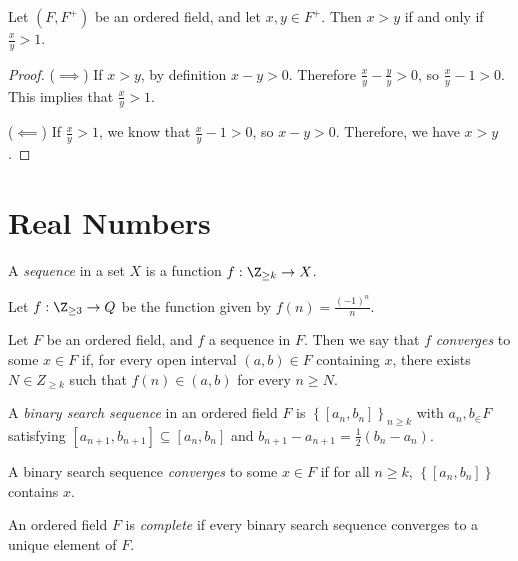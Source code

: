 \documentclass[12pt]{article}
\begin{document}
\begin{prop}\label{greater-than-ratio}
    Let $(F, F^+)$ be an ordered field, and let $x, y \in F^{+}$. Then $x > y$ if and only if $\frac{x}{y} > 1$.
\end{prop}

\begin{proof}\proofbreak
    ($\implies$) If $x > y$, by definition $x - y > 0$. Therefore $\frac{x}{y} - \frac{y}{y} > 0$, so $\frac{x}{y} - 1 > 0$. This implies that $\frac{x}{y} > 1$.

    ($\impliedby$) If $\frac{x}{y} > 1$, we know that $\frac{x}{y} - 1 > 0$, so $x - y > 0$. Therefore, we have $x > y$.
\end{proof}

\section{Real Numbers}

\begin{defn}
    A \emph{sequence} in a set $X$ is a function $f: \Z_{\geq k} \to X$.
\end{defn}

\begin{exmp}
    Let $f: \Z_{\geq 3} \to Q$ be the function given by $f(n) = \frac{(-1)^n}{n}$.
\end{exmp}

\begin{defn}
    Let $F$ be an ordered field, and $f$ a sequence in $F$. Then we say that $f$ \emph{converges} to some $x \in F$ if, for every open interval $(a, b) \in F$ containing $x$, there exists $N \in Z_{\geq k}$ such that $f(n) \in (a, b)$ for every $n \geq N$.
\end{defn}

\begin{defn}
    A \emph{binary search sequence} in an ordered field $F$ is $\left\{[a_n, b_n]\right\}_{n \geq k}$ with $a_n, b_ \in F$ satisfying $[a_{n+1}, b_{n+1}] \subseteq [a_n, b_n]$ and $b_{n+1}-a_{n+1} = \frac{1}{2}(b_n - a_n)$.
\end{defn}

\begin{defn}
    A binary search sequence \emph{converges} to some $x \in F$ if for all $n \geq k$, $\left\{[a_n, b_n]\right\}$ contains $x$.
\end{defn}

\begin{defn}
    An ordered field $F$ is \emph{complete} if every binary search sequence converges to a unique element of $F$.
\end{defn}
\end{document}

